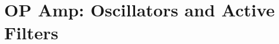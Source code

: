 \documentclass[../course]{subfiles}
\begin{document}
\chapter{OP Amp: Oscillators and Active Filters}


\end{document}
